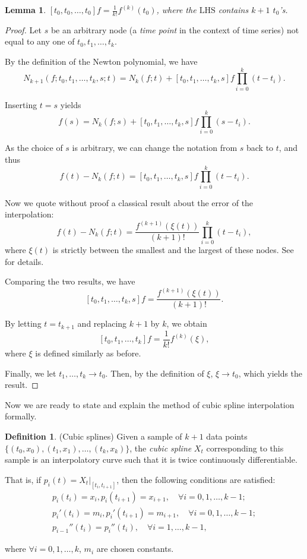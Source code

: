 \documentclass[a4paper,11pt,titlepage]{article}
\theoremstyle{definition}
\newtheorem{definition}{Definition}[section]
\theoremstyle{plain}
\newtheorem{lemma}[theorem]{Lemma}
\theoremstyle{remark}
\begin{document}
\begin{lemma}\label{lemma53}
    $[t_0,t_0,\dots,t_0]f=\frac{1}{k!}f^{(k)}(t_0)$, where the $\mathrm{LHS}$ contains $k+1$ $t_0$'s.
\end{lemma}
\begin{proof}
    \cite{Gautschi2012} Let $s$ be an arbitrary node (a \textit{time point} in the context of time series) not equal to any one of $t_0,t_1,\dots,t_k$.
    
    By the definition of the Newton polynomial, we have
    $$N_{k+1}(f;t_0,t_1,\dots,t_k,s;t)=N_k(f;t)+[t_0,t_1,\dots,t_k,s]f\prod_{i=0}^k(t-t_i).$$
    
    Inserting $t=s$ yields
    $$f(s)=N_k(f;s)+[t_0,t_1,\dots,t_k,s]f\prod_{i=0}^k(s-t_i).$$

    As the choice of $s$ is arbitrary, we can change the notation from $s$ back to $t$, and thus
    $$f(t)-N_k(f;t)=[t_0,t_1,\dots,t_k,s]f\prod_{i=0}^k(t-t_i).$$

    Now we quote without proof a classical result about the error of the interpolation:
    $$f(t)-N_k(f;t)=\frac{f^{(k+1)}(\xi(t))}{(k+1)!}\prod_{i=0}^k(t-t_i),$$
    where $\xi(t)$ is strictly between the smallest and the largest of these nodes. See \cite{Gautschi2012} for details.

    Comparing the two results, we have
    $$[t_0,t_1,\dots,t_k,s]f=\frac{f^{(k+1)}(\xi(t))}{(k+1)!}.$$
    
    By letting $t=t_{k+1}$ and replacing $k+1$ by $k$, we obtain
    $$[t_0,t_1,\dots,t_k]f=\frac{1}{k!}f^{(k)}(\xi),$$
    where $\xi$ is defined similarly as before.

    Finally, we let $t_1,\dots,t_k\rightarrow t_0$. Then, by the definition of $\xi$, $\xi\rightarrow t_0$, which yields the result.
\end{proof}

Now we are ready to state and explain the method of cubic spline interpolation formally.

\begin{definition}
    (Cubic splines) Given a sample of $k+1$ data points
$\{(t_0,x_0), (t_1,x_1), \dots, (t_k,x_k)\}$, the \textit{cubic spline} $X_t$ corresponding to this sample is an interpolatory curve such that it is twice continuously differentiable.

That is, if $p_i(t)=X_t|_{[t_i,t_{i+1}]}$, then the following conditions are satisfied:
\begin{align}
p_i(t_i)=x_i, p_i(t_{i+1})=x_{i+1},\quad\forall i=0,1,\dots,k-1; \tag{A}\label{eqA}\\
p_i'(t_i)=m_i, p_i'(t_{i+1})=m_{i+1},\quad\forall i=0,1,\dots,k-1; \tag{B}\label{eqB}\\
p_{i-1}''(t_i)=p_i''(t_i),\quad\forall i=1,\dots,k-1, \tag{C}\label{eqC}
\end{align}

where $\forall i=0,1,\dots,k$, $m_i$ are chosen constants.
\end{definition}
\end{document}

